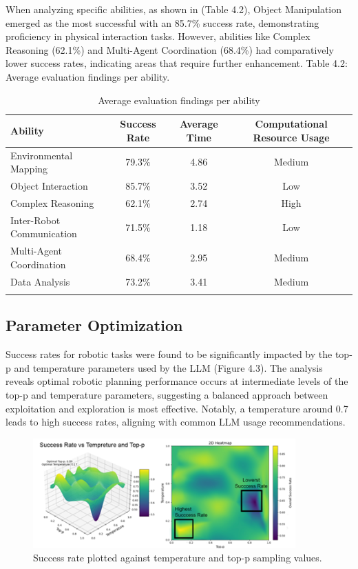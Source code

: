 \documentclass[pdflatex,sn-mathphys-num]{sn-jnl}%
\theoremstyle{thmstyleone}
\theoremstyle{thmstyletwo}%
\theoremstyle{thmstylethree}%
\begin{document}
When analyzing specific abilities, as shown in (Table 4.2), Object Manipulation emerged as the most successful with an 85.7\% success rate, demonstrating proficiency in physical interaction tasks. However, abilities like Complex Reasoning (62.1\%) and Multi-Agent Coordination (68.4\%) had comparatively lower success rates, indicating areas that require further enhancement.
Table 4.2: Average evaluation findings per ability.
\begin{table}[h]
\caption{Average evaluation findings per ability}\label{tab2}
\begin{tabular*}{\textwidth}{@{\extracolsep\fill}lccc}
\toprule
Ability & Success Rate & Average Time & Computational Resource Usage \\
\midrule
Environmental Mapping & 79.3\% & 4.86 & Medium \\
Object Interaction & 85.7\% & 3.52 & Low \\
Complex Reasoning & 62.1\% & 2.74 & High \\
Inter-Robot Communication & 71.5\% & 1.18 & Low \\
Multi-Agent Coordination & 68.4\% & 2.95 & Medium \\
Data Analysis & 73.2\% & 3.41 & Medium \\
\botrule
\end{tabular*}
\end{table}
\subsection{Parameter Optimization}
Success rates for robotic tasks were found to be significantly impacted by the top-p and temperature parameters used by the LLM (Figure 4.3).
The analysis reveals optimal robotic planning performance occurs at intermediate levels of the top-p and temperature parameters, suggesting a balanced approach between exploitation and exploration is most effective. Notably, a temperature around 0.7 leads to high success rates, aligning with common LLM usage recommendations.
\begin{figure}[H]
\centering
\includegraphics[width=0.9\textwidth]{figures/Picture1.png}
\caption{Success rate plotted against temperature and top-p sampling values.}\label{fig11}
\end{figure}
\end{document}
